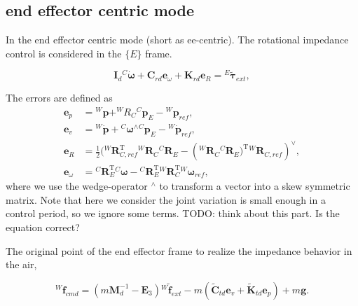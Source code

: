 \subsection{end effector centric mode}
In the end effector centric mode (short as ee-centric).
The rotational impedance control is considered in the $\{E\}$ frame.

\begin{equation}
\label{eq:impedance ee}
{\boldsymbol{I}_{d}}{^C\!\dot{\boldsymbol{\omega}}}+{\boldsymbol{C}_{rd}}{\boldsymbol{e}_\omega}+{\boldsymbol{K}_{rd}}{\boldsymbol{e}_R}={^E\!\boldsymbol{\tilde{\tau}}_{ext}},
\end{equation}

The errors are defined as
\begin{subequations}
\label{eq:error ee mode}
\begin{align}
    {\boldsymbol{e}_p}&={^W\!\boldsymbol{p}} + ^W\!\!R_C{^C\!\boldsymbol{p}_E}-{^W\!\boldsymbol{p}_{ref}}, \\[2pt]
    {\boldsymbol{e}_v}&={^W\!\dot{\boldsymbol{p}}}+{}^C\boldsymbol{\omega}^\wedge{}^C\boldsymbol{p}_E-{^W\!\dot{\boldsymbol{p}}_{ref}}, \\[2pt]
    {\boldsymbol{e}_R}&=\frac{1}{2}({^W\!\boldsymbol{R}^{\mathrm{T}}_{C,ref}}{^W\!\boldsymbol{R}_{C}}{^C\!\boldsymbol{R}_{E}}-({^W\!\boldsymbol{R}_{C}}{^C\!\boldsymbol{R}_{E})^{\mathrm{T}}}{^W\!\boldsymbol{R}_{C,ref}})^\vee, \\[2pt]
    {\boldsymbol{e}_\omega}&={^C\!\boldsymbol{R}^{\mathrm{T}}_E{}^C\!\boldsymbol{\omega}}-{^C\!\boldsymbol{R}^{\mathrm{T}}_E {}^W\!\boldsymbol{R}^{\mathrm{T}}_{C}}{^W\!\boldsymbol{\omega}}_{ref},
\end{align}
\end{subequations} 
where we use the wedge-operator $^\wedge$ to transform a vector into a skew symmetric matrix.
Note that here we consider the joint variation is small enough in a control period, so we ignore some terms.
TODO: think about this part. Is the equation correct?

The original point of the end effector frame to realize the impedance behavior in the air, 

\begin{equation}
\label{eq:imp cmd for trans2}
    {^W\!\boldsymbol{f}_{cmd}}=(m\boldsymbol{M}^{-1}_d-\boldsymbol{E}_3){^W\!\boldsymbol{\tilde{f}}_{ext}}-m(\tilde{\boldsymbol{C}}_{td}{\boldsymbol{e}_v}+{\tilde{\boldsymbol{K}}_{td}}{\boldsymbol{e}_p})+m\boldsymbol{g}.
\end{equation}

